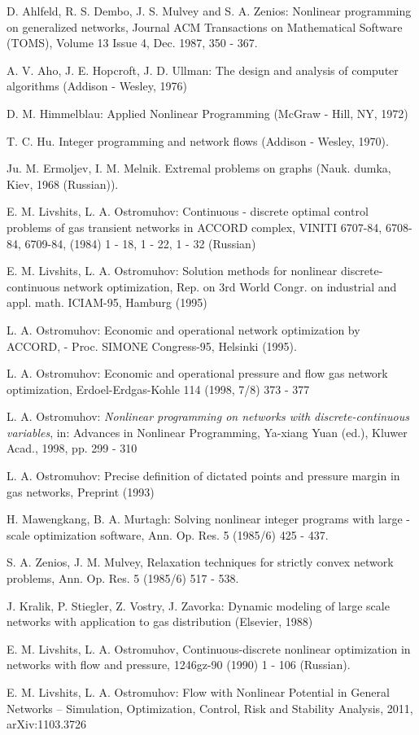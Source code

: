 \documentclass{article}
\begin{document}
\begin{thebibliography}{99}
 D. Ahlfeld, R. S. Dembo, J. S. Mulvey and S. A.
Zenios: Nonlinear programming on generalized networks, Journal ACM
Transactions on Mathematical Software (TOMS), Volume 13 Issue 4, Dec. 1987,
350 - 367.

 A. V. Aho, J. E. Hopcroft, J. D. Ullman: The design and
analysis of computer algorithms (Addison - Wesley, 1976)

 D. M. Himmelblau: Applied Nonlinear Programming
(McGraw - Hill, NY, 1972)

 T. C. Hu. Integer programming and network flows (Addison -
Wesley, 1970).

 Ju. M. Ermoljev, I. M. Melnik. Extremal problems on graphs
(Nauk. dumka, Kiev, 1968 (Russian)).

 E. M. Livshits, L. A. Ostromuhov: Continuous -
discrete optimal control problems of gas transient networks in ACCORD
complex, VINITI 6707-84, 6708-84, 6709-84, (1984) 1 - 18, 1 - 22, 1 - 32
(Russian)

 E. M. Livshits, L. A. Ostromuhov: Solution methods for
nonlinear discrete-continuous network optimization, Rep. on 3rd World Congr.
on industrial and appl. math. ICIAM-95, Hamburg (1995)

 L. A. Ostromuhov: Economic and operational network
optimization by ACCORD, - Proc. SIMONE Congress-95, Helsinki (1995).

 L. A. Ostromuhov: Economic and operational pressure and
flow gas network optimization, Erdoel-Erdgas-Kohle 114 (1998, 7/8) 373 - 377

 L. A. Ostromuhov: \textit{Nonlinear programming on
networks with discrete-continuous variables}, in: Advances in Nonlinear
Programming, Ya-xiang Yuan (ed.), Kluwer Acad., 1998, pp. 299 - 310

 L. A. Ostromuhov: Precise definition of dictated points and
pressure margin in gas networks, Preprint (1993)

 H. Mawengkang, B. A. Murtagh: Solving nonlinear
integer programs with large - scale optimization software, Ann. Op. Res. 5
(1985/6) 425 - 437.

 S. A. Zenios, J. M. Mulvey, Relaxation techniques for
strictly convex network problems, Ann. Op. Res. 5 (1985/6) 517 - 538.

 J. Kralik, P. Stiegler, Z. Vostry, J. Zavorka:
Dynamic modeling of large scale networks with application to gas
distribution (Elsevier, 1988)

 E. M. Livshits, L. A. Ostromuhov, Continuous-discrete
nonlinear optimization in networks with flow and pressure, 1246gz-90 (1990)
1 - 106 (Russian).

 E. M. Livshits, L. A. Ostromuhov: Flow with Nonlinear
Potential in General Networks -- Simulation, Optimization, Control, Risk and
Stability Analysis, 2011, arXiv:1103.3726
\end{thebibliography}
\end{document}
